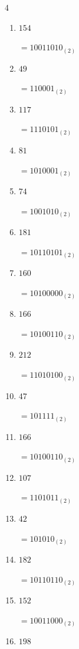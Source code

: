 \begin{multicols}{4}
\begin{enumerate}
        $=101111_{(2)}$

  \item $154$

        $=10011010_{(2)}$

  \item $49$

        $=110001_{(2)}$

  \item $117$

        $=1110101_{(2)}$

  \item $81$

        $=1010001_{(2)}$

  \item $74$

        $=1001010_{(2)}$

  \item $181$

        $=10110101_{(2)}$

  \item $160$

        $=10100000_{(2)}$

  \item $166$

        $=10100110_{(2)}$

  \item $212$

        $=11010100_{(2)}$

  \item $47$

        $=101111_{(2)}$

\columnbreak %

  \item $166$

        $=10100110_{(2)}$

  \item $107$

        $=1101011_{(2)}$

  \item $42$

        $=101010_{(2)}$

  \item $182$

        $=10110110_{(2)}$

  \item $152$

        $=10011000_{(2)}$

  \item $198$


\end{enumerate}
\end{multicols}
